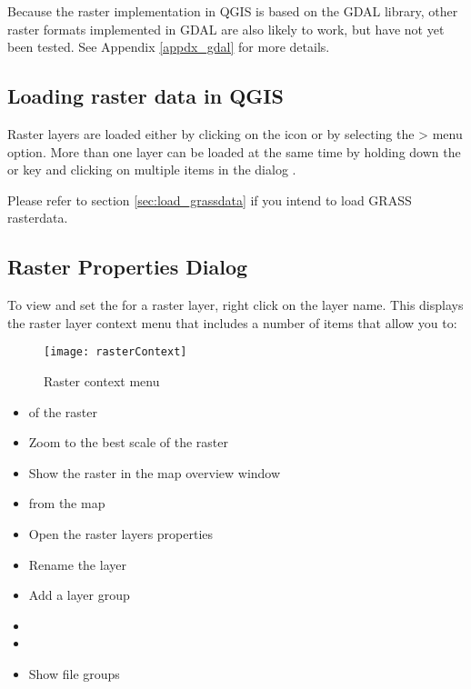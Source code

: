Because the raster implementation in QGIS is based on the GDAL library, other
raster formats implemented in GDAL are also likely to work, but have not yet
been tested. See Appendix \ref{appdx_gdal} for more
details.
	
\subsection{Loading raster data in QGIS}\label{label_loadraster}

Raster layers are loaded either by clicking on the 
 icon or by
selecting the > menu option. More than one 
layer can be loaded at the same time by holding down the
 or  key
and clicking on multiple items in the dialog .

Please refer to section \ref{sec:load_grassdata} if you intend to load GRASS rasterdata.
	
\subsection{Raster Properties Dialog}\label{label_rasterprop}

To view and set the  for a raster layer, right click on the layer
name. This displays the raster layer context menu that includes a number of
items that allow you to:

\begin{figure}[ht]
 \begin{center}
   \caption{Raster context menu}\label{fig:raster_contextmenu}\smallskip
   \texttt{[image: rasterContext]}
 \end{center}  
\end{figure}

\begin{itemize}
\item {} of the raster
\item Zoom to the best scale of the raster
\item Show the raster in the map overview window
\item {} from the map
\item Open the raster layers properties
\item Rename the layer
\item Add a layer group
\item {}
\item {}
\item Show file groups
\end{itemize}

